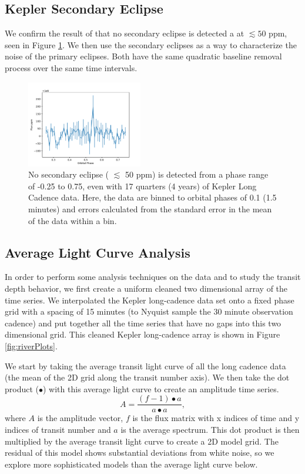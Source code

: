 \documentclass[preprint]{aastex61}
\begin{document}
\subsection{Kepler Secondary Eclipse}

We confirm the result of \citet{vanWerkhoven2014} that no secondary eclipse is detected a at $\lesssim 50$ ppm, seen in Figure \ref{fig:secEclipse}. 
We then use the secondary eclipses as a way to characterize the noise of the primary eclipses.
Both have the same quadratic baseline removal process over the same time intervals.

\begin{figure}[!hbtp]
\begin{centering}
\includegraphics[width=0.45\textwidth]{images/kepler/secondary_eclipse.pdf}
\caption{No secondary eclipse ( $\lesssim$ 50 ppm) is detected from a phase range of -0.25 to 0.75, even with 17 quarters (4 years) of Kepler Long Cadence data.
Here, the data are binned to orbital phases of 0.1 (1.5 minutes) and errors calculated from the standard error in the mean of the data within a bin.
}\label{fig:secEclipse}
\end{centering}
\end{figure}

\subsection{Average Light Curve Analysis}

In order to perform some analysis techniques on the data and to study the transit depth behavior, we first create a uniform cleaned two dimensional array of the time series.
We interpolated the Kepler long-cadence data set onto a fixed phase grid with a spacing of 15 minutes (to Nyquist sample the 30 minute observation cadence) and put together all the time series that have no gaps into this two dimensional grid.
This cleaned Kepler long-cadence array is shown in Figure \ref{fig:riverPlots}.

We start by taking the average transit light curve of all the long cadence data (the mean of the 2D grid along the transit number axis).
We then take the dot product ($\bullet$) with this average light curve to create an amplitude time series.
\begin{equation}
A = \frac{(f - 1) \bullet a}{a \bullet a},
\end{equation}
where $A$ is the amplitude vector, $f$ is the flux matrix with x indices of time and y indices of transit number and $a$ is the average spectrum.
This dot product is then multiplied by the average transit light curve to create a 2D model grid.
The residual of this model shows substantial deviations from white noise, so we explore more sophisticated models than the average light curve below.
\end{document}
